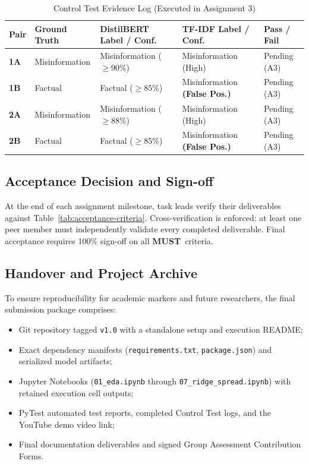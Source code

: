 \documentclass[11pt, a4paper]{article}
\newcommand{\badgeMust}{\colorbox{mustRedBg}{\textcolor{mustRedText}{\scriptsize\textsf{\textbf{MUST}}}}}
\newcommand{\code}[1]{\texttt{\small #1}}
\begin{document}
\begin{table}[H]
  \centering
  \small
  \caption{Control Test Evidence Log (Executed in Assignment 3)}
  \label{tab:control-log}
  \begin{tabularx}{\textwidth}{@{}C{1.2cm} L{3.0cm} Y Y C{1.8cm}@{}}
    \toprule
    \textbf{Pair} & \textbf{Ground Truth} & \textbf{DistilBERT Label / Conf.} & \textbf{TF-IDF Label / Conf.} & \textbf{Pass / Fail} \\
    \midrule
    \textbf{1A} & Misinformation & Misinformation ($\ge 90$\%) & Misinformation (High) & Pending (A3) \\
    \textbf{1B} & Factual & Factual ($\ge 85$\%) & Misinformation \textcolor{mustRedText}{\textbf{(False Pos.)}} & Pending (A3) \\
    \textbf{2A} & Misinformation & Misinformation ($\ge 88$\%) & Misinformation (High) & Pending (A3) \\
    \textbf{2B} & Factual & Factual ($\ge 85$\%) & Misinformation \textcolor{mustRedText}{\textbf{(False Pos.)}} & Pending (A3) \\
    \bottomrule
  \end{tabularx}
\end{table}

\subsection{Acceptance Decision and Sign-off}
At the end of each assignment milestone, task leads verify their deliverables against Table~\ref{tab:acceptance-criteria}. Cross-verification is enforced: at least one peer member must independently validate every completed deliverable. Final acceptance requires 100\% sign-off on all \badgeMust\ criteria.

\subsection{Handover and Project Archive}
To ensure reproducibility for academic markers and future researchers, the final submission package comprises:
\begin{itemize}
  \item Git repository tagged \code{v1.0} with a standalone setup and execution README;
  \item Exact dependency manifests (\code{requirements.txt}, \code{package.json}) and serialized model artifacts;
  \item Jupyter Notebooks (\code{01\_eda.ipynb} through \code{07\_ridge\_spread.ipynb}) with retained execution cell outputs;
  \item PyTest automated test reports, completed Control Test logs, and the YouTube demo video link;
  \item Final documentation deliverables and signed Group Assessment Contribution Forms.
\end{itemize}
\end{document}
